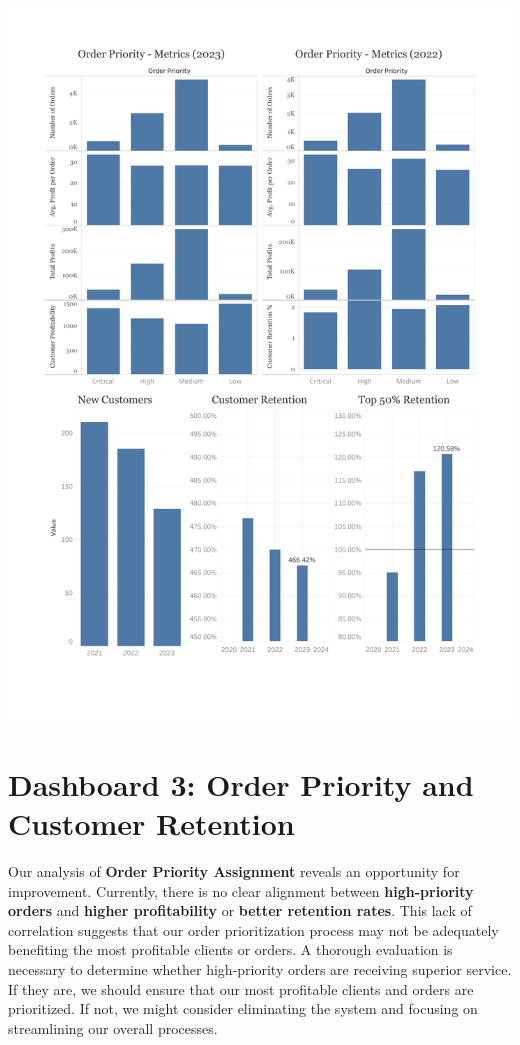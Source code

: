 \documentclass[12pt,a4paper]{article}
\begin{document}
\noindent
\includegraphics[width=\paperwidth,height=\paperheight,keepaspectratio]{Dashboard3.pdf}

\restoregeometry

\newpage

\section{Dashboard 3: Order Priority and Customer Retention}

Our analysis of \textbf{Order Priority Assignment} reveals an opportunity for improvement. Currently, there is no clear alignment between \textbf{high-priority orders} and \textbf{higher profitability} or \textbf{better retention rates}. This lack of correlation suggests that our order prioritization process may not be adequately benefiting the most profitable clients or orders. A thorough evaluation is necessary to determine whether high-priority orders are receiving superior service. If they are, we should ensure that our most profitable clients and orders are prioritized. If not, we might consider eliminating the system and focusing on streamlining our overall processes.
\end{document}
